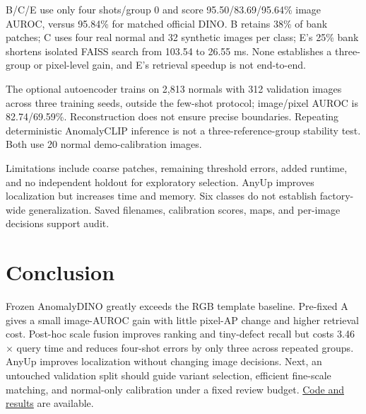 \documentclass[times,10pt,twocolumn,letterpaper]{article}
\begin{document}
B/C/E use only four shots/group 0 and score 95.50/83.69/95.64\% image AUROC, versus 95.84\% for matched official DINO. B retains 38\% of bank patches; C uses four real normal and 32 synthetic images per class; E's 25\% bank shortens isolated FAISS search from 103.54 to 26.55 ms. None establishes a three-group or pixel-level gain, and E's retrieval speedup is not end-to-end.

The optional autoencoder trains on 2,813 normals with 312 validation images across three training seeds, outside the few-shot protocol; image/pixel AUROC is 82.74/69.59\%. Reconstruction does not ensure precise boundaries. Repeating deterministic AnomalyCLIP inference is not a three-reference-group stability test. Both use 20 normal demo-calibration images.

Limitations include coarse patches, remaining threshold errors, added runtime, and no independent holdout for exploratory selection. AnyUp improves localization but increases time and memory. Six classes do not establish factory-wide generalization. Saved filenames, calibration scores, maps, and per-image decisions support audit.

\FloatBarrier
\section{Conclusion}
\label{sec:conclusion}
Frozen AnomalyDINO greatly exceeds the RGB template baseline. Pre-fixed A gives a small image-AUROC gain with little pixel-AP change and higher retrieval cost. Post-hoc scale fusion improves ranking and tiny-defect recall but costs 3.46$\times$ query time and reduces four-shot errors by only three across repeated groups. AnyUp improves localization without changing image decisions. Next, an untouched validation split should guide variant selection, efficient fine-scale matching, and normal-only calibration under a fixed review budget. \href{https://github.com/yedaojun/AIAA3201-Project-2}{Code and results} are available.

{\small


}
\end{document}
